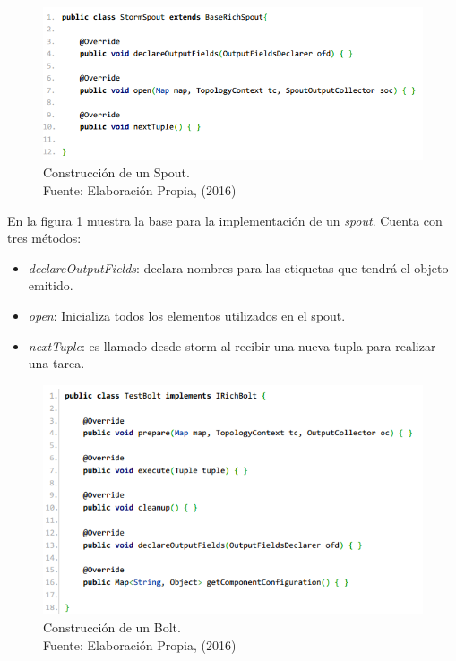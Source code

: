 \begin{figure}[H]
	\centering
	\captionsetup{justification=centering}
	\includegraphics[scale=0.8]{images/SpoutBase.png}
	\caption[Construcción de un Spout.]{Construcción de un Spout.\\Fuente: Elaboración Propia, (2016)}
	\label{fig:spoutbase}
\end{figure}

En la figura \ref{fig:spoutbase} muestra la base para la implementación de un \textit{spout}. Cuenta con tres métodos:

\begin{itemize}
\item \textit{declareOutputFields}: declara nombres para las etiquetas que tendrá el objeto emitido.
\item \textit{open}: Inicializa todos los elementos utilizados en el spout.
\item \textit{nextTuple}: es llamado desde storm al recibir una nueva tupla para realizar una tarea.
\end{itemize}	

\begin{figure}[H]
	\centering
	\captionsetup{justification=centering}
	\includegraphics[scale=0.8]{images/BoltBase.png}
	\caption[Construcción de un Bolt.]{Construcción de un Bolt.\\Fuente: Elaboración Propia, (2016)}
	\label{fig:boltbase}
\end{figure}

